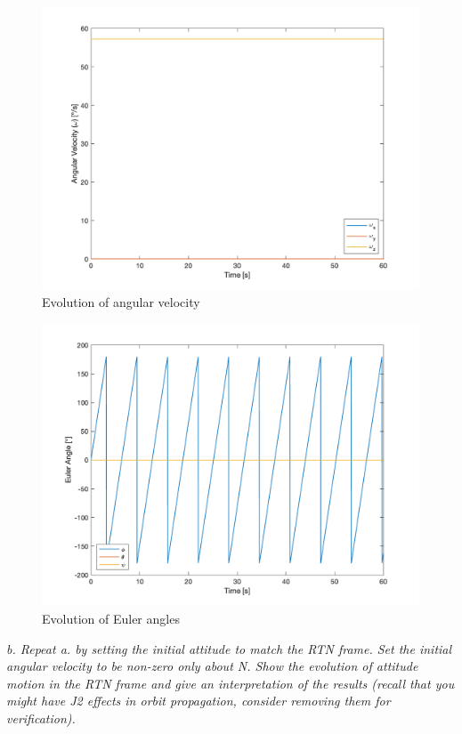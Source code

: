 \begin{figure}[H]
\centering
\includegraphics[scale=0.6]{Images/ps4_problem1a_angvel.png}
\caption{Evolution of angular velocity}
\label{fig:ps4_problem1a_angvel}
\end{figure}

\begin{figure}[H]
\centering
\includegraphics[scale=0.6]{Images/ps4_problem1a_angle.png}
\caption{Evolution of Euler angles}
\label{fig:ps4_problem1a_angle}
\end{figure}

\textit{b. Repeat a. by setting the initial attitude to match the RTN frame. Set the initial angular velocity to be non-zero only about N. Show the evolution of attitude motion in the RTN frame and give an interpretation of the results (recall that you might have J2 effects in orbit propagation, consider removing them for verification).}

